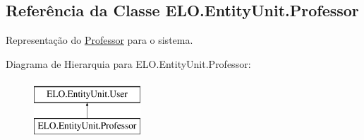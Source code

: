 \hypertarget{classELO_1_1EntityUnit_1_1Professor}{}\subsection{Referência da Classe E\+L\+O.\+Entity\+Unit.\+Professor}
\label{classELO_1_1EntityUnit_1_1Professor}


Representação do \hyperlink{classELO_1_1EntityUnit_1_1Professor}{Professor} para o sistema.  


Diagrama de Hierarquia para E\+L\+O.\+Entity\+Unit.\+Professor\+:\begin{figure}[H]
\begin{center}
\leavevmode
\includegraphics[height=2.000000cm]{d5/df1/classELO_1_1EntityUnit_1_1Professor}
\end{center}
\end{figure}

